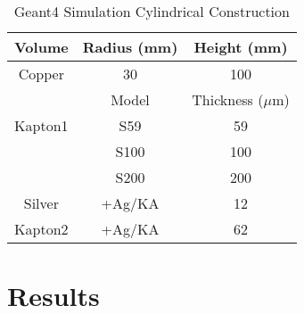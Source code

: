 \documentclass{mc2015}
\begin{document}
\begin{table}
  \centering
  \caption{Geant4 Simulation Cylindrical Construction}
  \begin{tabular}{ccc}
    \toprule
    Volume  & Radius (mm) & Height (mm) \\
    \midrule
    Copper  & \num{30} & \num{100} \\
    \toprule\toprule
            & Model    & Thickness ($\mu$m) \\
    \midrule
    Kapton1 & S59      & \num{59}  \\
            & S100     & \num{100} \\
            & S200     & \num{200} \\
    Silver  & +Ag/KA   & \num{12}  \\
    Kapton2 & +Ag/KA   & \num{62}  \\
    \bottomrule
  \end{tabular}
  \label{tab:geant4setup}
\end{table}

\section{Results}
\end{document}
